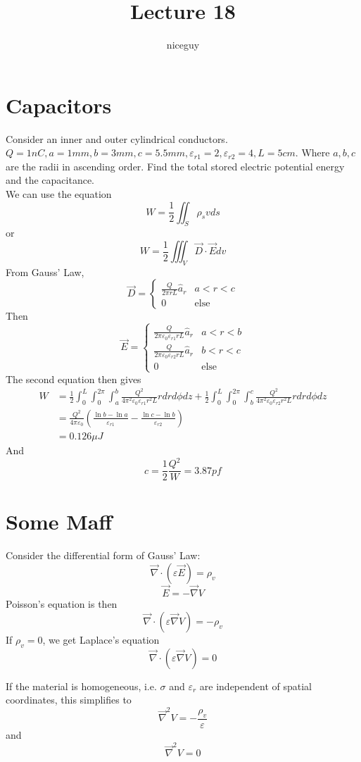 \documentclass[12pt]{article}
\author{niceguy}
\title{Lecture 18}
\begin{document}
\maketitle

\section{Capacitors}

\begin{ex}

	Consider an inner and outer cylindrical conductors. $Q = 1\unit{nC}, a = 1\unit{mm}, b = 3\unit{mm}, c = 5.5\unit{mm}, \varepsilon_{r1} = 2, \varepsilon_{r2} = 4, L = 5\unit{cm}$. Where $a,b,c$ are the radii in ascending order. Find the total stored electric potential energy and the capacitance. \\
	We can use the equation
	$$W = \frac{1}{2} \iint_S \rho_s vds$$
	or
	$$W = \frac{1}{2} \iiint_V \vec{D} \cdot \vec{E} dv$$
	From Gauss' Law,
	$$\vec{D} = \begin{cases} \frac{Q}{2\pi rL}\hat{a}_r & a < r < c \\ 0 & \text{else} \end{cases}$$
	Then
	$$\vec{E} = \begin{cases} \frac{Q}{2\pi \varepsilon_0\varepsilon_{r1} rL}\hat{a}_r & a < r < b \\ \frac{Q}{2\pi \varepsilon_0\varepsilon_{r2} rL}\hat{a}_r & b < r < c \\ 0 & \text{else} \end{cases}$$
	The second equation then gives
	\begin{align*}
		W &= \frac{1}{2} \int_0^L \int_0^{2\pi} \int_a^b \frac{Q^2}{4\pi^2 \varepsilon_0\varepsilon_{r1} r^2L} rdrd\phi dz + \frac{1}{2} \int_0^L \int_0^{2\pi} \int_b^c \frac{Q^2}{4\pi^2 \varepsilon_0\varepsilon_{r2} r^2L} rdrd\phi dz \\
		  &= \frac{Q^2}{4\pi\varepsilon_0}\left(\frac{\ln b - \ln a}{\varepsilon_{r1}} - \frac{\ln c - \ln b}{\varepsilon_{r2}}\right) \\
		  &= 0.126\unit{\mu J}
	\end{align*}
	And
	$$c = \frac{1}{2} \frac{Q^2}{W} = 3.87\unit{pf}$$
\end{ex}

\section{Some Maff}

Consider the differential form of Gauss' Law:
$$\vec{\nabla} \cdot (\varepsilon\vec{E}) = \rho_v$$
$$\vec{E} = -\vec{\nabla} V$$
Poisson's equation is then
$$\vec{\nabla}\cdot(\varepsilon\vec{\nabla}V) = -\rho_v$$
If $\rho_v = 0$, we get Laplace's equation
$$\vec{\nabla}\cdot(\varepsilon\vec{\nabla}V) = 0$$

If the material is homogeneous, i.e. $\sigma$ and $\varepsilon_r$ are independent of spatial coordinates, this simplifies to
$$\vec{\nabla}^2V = -\frac{\rho_v}{\varepsilon}$$
and
$$\vec{\nabla}^2V = 0$$
\end{document}
